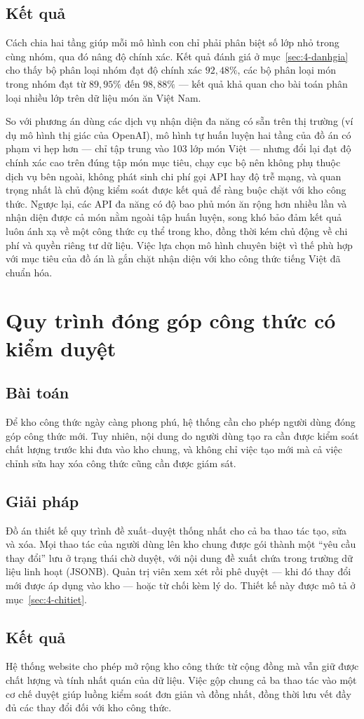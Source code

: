 \documentclass[../DoAn.tex]{subfiles}
\begin{document}
\subsection*{Kết quả}
Cách chia hai tầng giúp mỗi mô hình con chỉ phải phân biệt số lớp nhỏ trong cùng nhóm, qua đó nâng độ chính xác. Kết quả đánh giá ở mục~\ref{sec:4-danhgia} cho thấy bộ phân loại nhóm đạt độ chính xác $92{,}48\%$, các bộ phân loại món trong nhóm đạt từ $89{,}95\%$ đến $98{,}88\%$ --- kết quả khả quan cho bài toán phân loại nhiều lớp trên dữ liệu món ăn Việt Nam.

So với phương án dùng các dịch vụ nhận diện đa năng có sẵn trên thị trường (ví dụ mô hình thị giác của OpenAI), mô hình tự huấn luyện hai tầng của đồ án có phạm vi hẹp hơn --- chỉ tập trung vào 103 lớp món Việt --- nhưng đổi lại đạt độ chính xác cao trên đúng tập món mục tiêu, chạy cục bộ nên không phụ thuộc dịch vụ bên ngoài, không phát sinh chi phí gọi API hay độ trễ mạng, và quan trọng nhất là chủ động kiểm soát được kết quả để ràng buộc chặt với kho công thức. Ngược lại, các API đa năng có độ bao phủ món ăn rộng hơn nhiều lần và nhận diện được cả món nằm ngoài tập huấn luyện, song khó bảo đảm kết quả luôn ánh xạ về một công thức cụ thể trong kho, đồng thời kém chủ động về chi phí và quyền riêng tư dữ liệu. Việc lựa chọn mô hình chuyên biệt vì thế phù hợp với mục tiêu của đồ án là gắn chặt nhận diện với kho công thức tiếng Việt đã chuẩn hóa.

\section{Quy trình đóng góp công thức có kiểm duyệt}
\label{sec:5-dongggop}

\subsection*{Bài toán}
Để kho công thức ngày càng phong phú, hệ thống cần cho phép người dùng đóng góp công thức mới. Tuy nhiên, nội dung do người dùng tạo ra cần được kiểm soát chất lượng trước khi đưa vào kho chung, và không chỉ việc tạo mới mà cả việc chỉnh sửa hay xóa công thức cũng cần được giám sát.

\subsection*{Giải pháp}
Đồ án thiết kế quy trình đề xuất--duyệt thống nhất cho cả ba thao tác tạo, sửa và xóa. Mọi thao tác của người dùng lên kho chung được gói thành một ``yêu cầu thay đổi'' lưu ở trạng thái chờ duyệt, với nội dung đề xuất chứa trong trường dữ liệu linh hoạt (JSONB). Quản trị viên xem xét rồi phê duyệt --- khi đó thay đổi mới được áp dụng vào kho --- hoặc từ chối kèm lý do. Thiết kế này được mô tả ở mục~\ref{sec:4-chitiet}.

\subsection*{Kết quả}
Hệ thống website cho phép mở rộng kho công thức từ cộng đồng mà vẫn giữ được chất lượng và tính nhất quán của dữ liệu. Việc gộp chung cả ba thao tác vào một cơ chế duyệt giúp luồng kiểm soát đơn giản và đồng nhất, đồng thời lưu vết đầy đủ các thay đổi đối với kho công thức.
\end{document}

